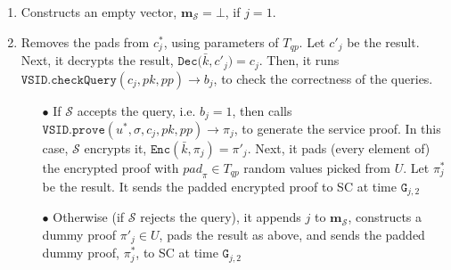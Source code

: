 \begin{enumerate}
\begin{enumerate}

\item Constructs an empty  vector, $\bm{m}_{\scriptscriptstyle\mathcal S}=\bot$, if $j=1$.  
\item Removes the pads from $c^{\scriptscriptstyle *}_{\scriptscriptstyle j}$, using  parameters of $T_{\scriptscriptstyle qp}$. Let  $c'_{\scriptscriptstyle j}$ be the result. Next, it  decrypts  the result, $\mathtt{Dec(}\bar{k},c'_{\scriptscriptstyle j})=c_{\scriptscriptstyle j}$. Then,  it   runs $\mathtt{VSID.checkQuery}(c_{\scriptscriptstyle j}, pk, {pp})\rightarrow b_{\scriptscriptstyle j}$, to check the correctness of the queries.





\begin{itemize}
\item[$\bullet$] If $\mathcal S$ accepts the query, i.e. $b_{\scriptscriptstyle j}=1$, then  calls $\mathtt{VSID.prove}(u^{\scriptscriptstyle *},\sigma,c_{\scriptscriptstyle j},pk,{pp})\rightarrow \pi_{\scriptscriptstyle j}$, to generate the service proof. In this case, $\mathcal S$ encrypts it, $\mathtt{Enc}(\bar{k},\pi_{\scriptscriptstyle j})=\pi'_{\scriptscriptstyle j}$. Next, it   pads (every element of) the encrypted proof with ${pad}_{\scriptscriptstyle \pi}\in T_{\scriptscriptstyle qp}$ random values  picked from $U$. Let $\pi^{\scriptscriptstyle *}_{\scriptscriptstyle j}$ be the result. It sends the padded encrypted proof  to SC at time $\texttt{G}_{\scriptscriptstyle j,2}$ 

\item[$\bullet$] Otherwise (if $\mathcal S$ rejects the query), it appends  $j$  to $\bm{m}_{\scriptscriptstyle\mathcal{S}}$,  constructs a dummy proof $\pi'_{\scriptscriptstyle j}\in U$,  pads the result as above, and sends the padded dummy proof, $\pi^{\scriptscriptstyle *}_{\scriptscriptstyle j}$, to SC at time $\texttt{G}_{\scriptscriptstyle j,2}$ %


\end{itemize}
\end{enumerate}
\end{enumerate}
